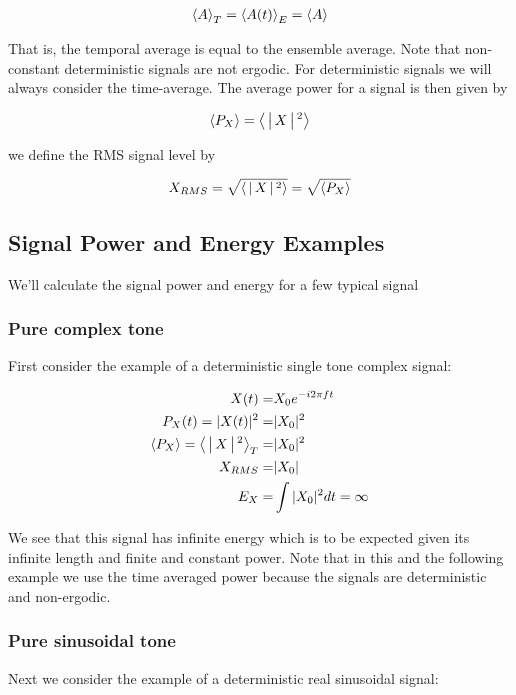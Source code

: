 \documentclass[12pt]{article}
\begin{document}
\begin{align}
\Braket{A}_T = \Braket{A(t)}_E = \Braket{A}
\end{align}

That is, the temporal average is equal to the ensemble average.
Note that non-constant deterministic signals are not ergodic.
For deterministic signals we will always consider the time-average.
The average power for a signal is then given by

\begin{align}
\braket{P_X} = \Braket{|X|^2}
\end{align}

we define the RMS signal level by

\begin{align}
X_{RMS} = \sqrt{\Braket{|X|^2}} = \sqrt{\Braket{P_X}}
\end{align}

\subsection{Signal Power and Energy Examples}

We'll calculate the signal power and energy for a few typical signal


\subsubsection{Pure complex tone}
First consider the example of a deterministic single tone complex signal:

\begin{align}
X(t) =& X_0 e^{-i2\pi f t}\\
P_X(t) = |X(t)|^2 =& |X_0|^2\\
\Braket{P_X}  = \Braket{|X|^2}_T =& |X_0|^2\\
X_{RMS} =& |X_0|\\
E_X =& \int |X_0|^2 dt = \infty
\end{align}

We see that this signal has infinite energy which is to be expected given its infinite length and finite and constant power.
Note that in this and the following example we use the time averaged power because the signals are deterministic and non-ergodic.


\subsubsection{Pure sinusoidal tone}
Next we consider the example of a deterministic real sinusoidal signal:
\end{document}
